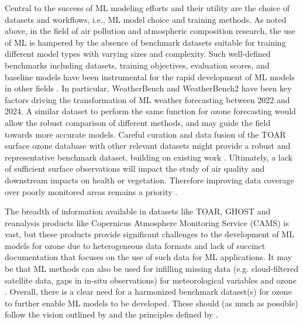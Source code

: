 \documentclass[gmd, manuscript]{copernicus}
\begin{document}

Central to the success of ML modeling efforts and their utility are the choice of datasets and workflows, i.e., ML model choice and training methods. As noted above, in the field of air pollution and atmospheric composition research, the use of ML is hampered by the absence of benchmark datasets suitable for training different model types with varying sizes and complexity. Such well-defined benchmarks including datasets, training objectives, evaluation scores, and baseline models have been instrumental for the rapid development of ML models in other fields  \citep{Dueben2022}. In particular, WeatherBench and WeatherBench2 \citep{Rasp2020, Rasp2024} have been key factors driving the transformation of ML  weather forecasting between 2022 and 2024. A similar dataset to perform the same function for ozone forecasting would allow the robust comparison of different methods, and may guide the field towards more accurate models. Careful curation and data fusion of the TOAR surface ozone database with other relevant datasets might provide a robust and representative benchmark dataset, building on existing work \citep{Betancourt2021}. Ultimately, a lack of sufficient surface observations will impact the study of air quality and downstream impacts on health or vegetation. Therefore improving data coverage over poorly monitored areas remains a priority \citep{Schultz2017}.

The breadth of information available in datasets like TOAR, GHOST and reanalysis products like Copernicus Atmosphere Monitoring Service (CAMS) is vast, but these products provide significant challenges to the development of ML models for ozone due to heterogeneous data formats and lack of succinct documentation that focuses on the use of such data for ML applications. It may be that ML methods can also be used for infilling missing data (e.g. cloud-filtered satellite data, gaps in in-situ observations) for meteorological variables \citep{Li2023_imputation} and ozone \citep{Arroyo2018, betancourt_global_2022}. Overall, there is a clear need for a harmonized benchmark dataset(s) for ozone to further enable ML models to be developed. These should (as much as possible) follow the vision outlined by \citet{ebert-uphoff_vision_2017} and the principles defined by \citet{Dueben2022}. 
\end{document}
